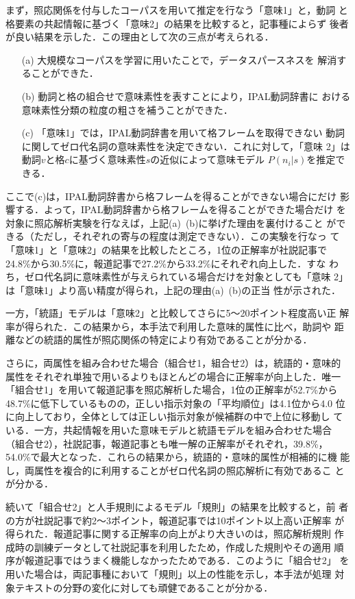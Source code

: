 まず，照応関係を付与したコーパスを用いて推定を行なう「意味1」と，動詞
と格要素の共起情報に基づく「意味2」の結果を比較すると，記事種によらず
後者が良い結果を示した．この理由として次の三点が考えられる．

\begin{enumerate}
\item[(a)]大規模なコーパスを学習に用いたことで，データスパースネスを
  解消することができた．
\item[(b)]動詞と格の組合せで意味素性を表すことにより，IPAL動詞辞書に
  おける意味素性分類の粒度の粗さを補うことができた．
\item[(c)]「意味1」では，IPAL動詞辞書を用いて格フレームを取得できない
  動詞に関してゼロ代名詞の意味素性を決定できない．これに対して，「意味
  2」は動詞$v$と格$c$に基づく意味素性$s$の近似によって意味モデル
  $P(n_i|s)$を推定できる．
\end{enumerate}

\noindent
ここで(c)は，IPAL動詞辞書から格フレームを得ることができない場合にだけ
影響する．よって，IPAL動詞辞書から格フレームを得ることができた場合だけ
を対象に照応解析実験を行なえば，上記(a)~(b)に挙げた理由を裏付けること
ができる（ただし，それぞれの寄与の程度は測定できない）．この実験を行なっ
て「意味1」と「意味2」の結果を比較したところ，1位の正解率が社説記事で
24.8\%から30.5\%に，報道記事で27.2\%から33.2\%にそれぞれ向上した．すな
わち，ゼロ代名詞に意味素性が与えられている場合だけを対象としても「意味
2」は「\mbox{意味1}」より高い精度が得られ，上記の理由(a)~(b)の正当
性が示された．

一方，「統語」モデルは「意味2」と比較してさらに5〜20ポイント程度高い正
解率が得られた．この結果から，本手法で利用した意味的属性に比べ，助詞や
距離などの統語的属性が照応関係の特定により有効であることが分かる．

さらに，両属性を組み合わせた場合（組合せ1，組合せ2）は，統語的・意味的
属性をそれぞれ単独で用いるよりもほとんどの場合に正解率が向上した．唯一
「組合せ1」を用いて報道記事を照応解析した場合，1位の正解率が52.7\%から
48.7\%に低下しているものの，正しい指示対象の「平均順位」は4.1位から4.0
位に向上しており，全体としては正しい指示対象が候補群の中で上位に移動し
ている．一方，共起情報を用いた意味モデルと統語モデルを組み合わせた場合
（組合せ2），社説記事，報道記事とも唯一解の正解率がそれぞれ，39.8\%，
54.0\%で最大となった．これらの結果から，統語的・意味的属性が相補的に機
能し，両属性を複合的に利用することがゼロ代名詞の照応解析に有効であるこ
とが分かる．

続いて「組合せ2」と人手規則によるモデル「規則」の結果を比較すると，前
者の方が社説記事で約2〜3ポイント，報道記事では10ポイント以上高い正解率
が得られた．報道記事に関する正解率の向上がより大きいのは，照応解析規則
作成時の訓練データとして社説記事を利用したため，作成した規則やその適用
順序が報道記事ではうまく機能しなかったためである．このように「組合せ2」
を用いた場合は，両記事種において「規則」以上の性能を示し，本手法が処理
対象テキストの分野の変化に対しても頑健であることが分かる．


